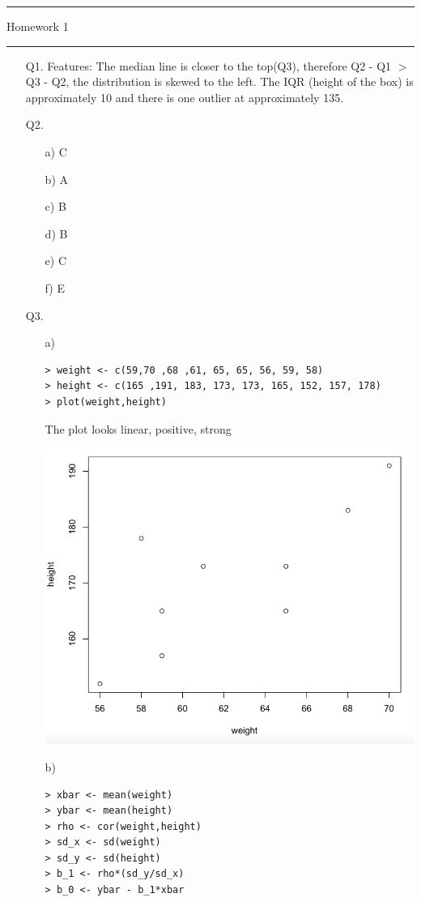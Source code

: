 \documentclass[letterpaper,12pt]{article}
\begin{document}
\thispagestyle{empty}

\hrule \vspace{0.5em}
 \hfill Homework 1 \newline \hrule

\begin{enumerate}
\item[Q1.] Features: The median line is closer to the top(Q3), therefore  Q2 - Q1 $>$ Q3 - Q2, the distribution is skewed to the left. The IQR (height of the box) is approximately 10 and there is one outlier at approximately 135.
\item[Q2.] 
\begin{enumerate}
\item[a)]C
\item[b)] A
\item[c)] B
\item[d)] B
\item[e)] C
\item[f)] E
\end{enumerate}
\item[Q3.] 
\begin{enumerate}
\item[a)]
\begin{lstlisting}
> weight <- c(59,70 ,68 ,61, 65, 65, 56, 59, 58)
> height <- c(165 ,191, 183, 173, 173, 165, 152, 157, 178)
> plot(weight,height)
\end{lstlisting}
The plot looks linear, positive, strong
\begin{center}
\includegraphics[scale = 0.4]{HW2-Q3-A}
\end{center}
\newpage
\item [b)]
\begin{lstlisting}
> xbar <- mean(weight)
> ybar <- mean(height)
> rho <- cor(weight,height)
> sd_x <- sd(weight)
> sd_y <- sd(height)
> b_1 <- rho*(sd_y/sd_x)
> b_0 <- ybar - b_1*xbar
\end{lstlisting}


\end{enumerate}
\end{enumerate}
\end{document}
